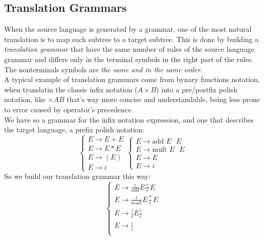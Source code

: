		\subsection{Translation Grammars}
			When the source language is generated by a grammar, one of the most natural translation is to map each subtree to a target subtree. This is done by building a \emph{translation grammar} that have the same number of rules of the source language grammar and differs only in the terminal symbols in the right part of the rules. The nonterminals symbols are \emph{the same and in the same order}.\\
			A typical example of translation grammars come from bynary functions notation, when translatin the classic infix notation ($A \times B$) into a pre/postfix polish notation, like $\times A B$ that's way more concise and understandable, being less prone to error caused by operator's precedence.\\
			We have so a grammar for the infix notation expression, and one that describes the target language, a prefix polish notation:
			\begin{equation}
				\begin{cases}
					E \rightarrow E + E \\
					E \rightarrow E * E \\
					E \rightarrow ( E ) \\
					E \rightarrow i
				\end{cases} 
				\begin{cases}
					E \rightarrow \text{add } E \text{ } E \\
					E \rightarrow \text{mult } E \text{ } E \\
					E \rightarrow E  \\
					E \rightarrow i
				\end{cases}
			\end{equation}
			So we build our translation grammar this way:
			\begin{equation}
				\begin{cases}
					E \rightarrow \frac{\epsilon}{add} E \frac{+}{\epsilon} E \\
					E \rightarrow \frac{\epsilon}{mult} E \frac{*}{\epsilon} E \\
					E \rightarrow \frac{(}{\epsilon} E \frac{)}{\epsilon} \\
					E \rightarrow \frac{i}{i} \\
				\end{cases}
			\end{equation}
			
